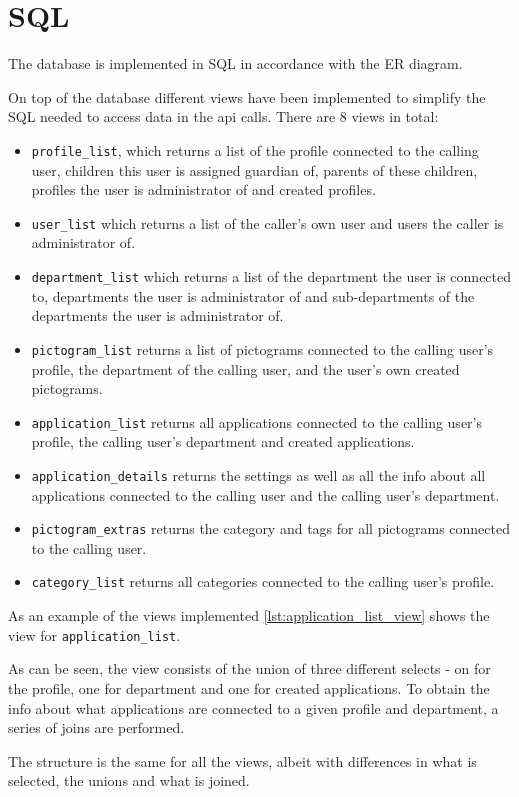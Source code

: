 \section{SQL}
The database is implemented in SQL in accordance with the ER diagram.

On top of the database different views have been implemented to simplify the SQL needed to access data in the \ac{api} calls. 
There are 8 views in total:
\begin{itemize}
\item \lstinline|profile_list|, which returns a list of the profile connected to the calling user, children this user is assigned guardian of, parents of these children, profiles the user is administrator of and created profiles. 
\item \lstinline|user_list| which returns a list of the caller's own user and users the caller is administrator of.
\item \lstinline|department_list| which returns a list of the department the user is connected to, departments the user is administrator of and sub-departments of the departments the user is administrator of.
\item \lstinline|pictogram_list| returns a list of pictograms connected to the calling user's profile, the department of the calling user, and the user's own created pictograms.
\item \lstinline|application_list| returns all applications connected to the calling user's profile, the calling user's department and created applications.
\item \lstinline|application_details| returns the settings as well as all the info about all applications connected to the calling user and the calling user's department.
\item \lstinline|pictogram_extras| returns the category and tags for all pictograms connected to the calling user.
\item \lstinline|category_list| returns all categories connected to the calling user's profile.
\end{itemize}

As an example of the views implemented \autoref{lst:application_list_view} shows the view for \lstinline|application_list|.



As can be seen, the view consists of the union of three different selects - on for the profile, one for department and one for created applications. To obtain the info about what applications are connected to a given profile and department, a series of joins are performed.

The structure is the same for all the views, albeit with differences in what is selected, the unions and what is joined.